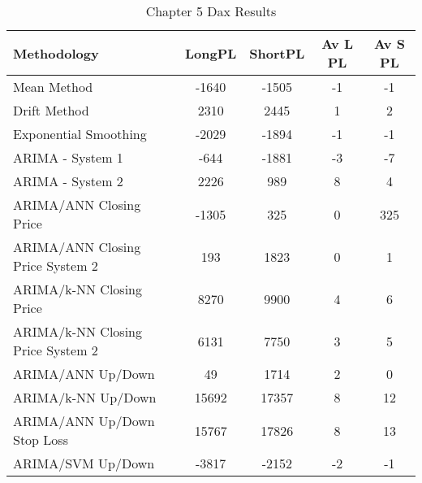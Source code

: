 \begin{table}[ht]
\centering
\caption[Chapter 5 Dax Results]{Chapter 5 Dax Results} 
\label{tab:chp6:dax2_summary}
\begin{tabular}{lcccc}
  \toprule Methodology & LongPL & ShortPL & Av L PL & Av S PL \\ 
  \midrule Mean Method & -1640 & -1505 & -1 & -1 \\ 
  Drift Method & 2310 & 2445 & 1 & 2 \\ 
  Exponential Smoothing & -2029 & -1894 & -1 & -1 \\ 
  ARIMA - System 1 & -644 & -1881 & -3 & -7 \\ 
  ARIMA - System 2 & 2226 & 989 & 8 & 4 \\ 
  ARIMA/ANN Closing Price & -1305 & 325 & 0 & 325 \\ 
  ARIMA/ANN Closing Price System 2 & 193 & 1823 & 0 & 1 \\ 
  ARIMA/k-NN Closing Price & 8270 & 9900 & 4 & 6 \\ 
  ARIMA/k-NN Closing Price System 2 & 6131 & 7750 & 3 & 5 \\ 
  ARIMA/ANN Up/Down & 49 & 1714 & 2 & 0 \\ 
  ARIMA/k-NN Up/Down & 15692 & 17357 & 8 & 12 \\ 
  ARIMA/ANN Up/Down Stop Loss & 15767 & 17826 & 8 & 13 \\ 
  ARIMA/SVM Up/Down & -3817 & -2152 & -2 & -1 \\ 
   \bottomrule \end{tabular}
\end{table}
